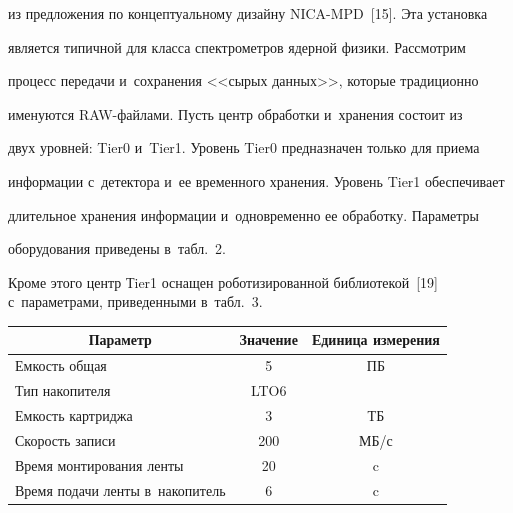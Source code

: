 из предложения по концептуальному дизайну NICA-MPD~[15]. Эта установка


является типичной для класса спектрометров ядерной физики. Рассмотрим


процесс передачи и~сохранения <<сырых данных>>, которые традиционно


именуются RAW-фай\-ла\-ми. Пусть центр обработки и~хранения состоит из


двух уровней: Tier0 и~Tier1. Уровень Tier0 предназначен только для приема


информации с~детектора и~ее временного хранения. Уровень Tier1 обеспечивает


длительное хранения информации и~одновременно ее обработку. Параметры


оборудования приведены в~табл.~2.














  Кроме этого центр Тier1 оснащен роботизированной библиотекой~[19] с~параметрами, приведенными в~табл.~3.





  \begin{table}\small


  \begin{center}




  \vspace*{2ex}





  \begin{tabular}{|l|c|c|}


  \hline


\multicolumn{1}{|c|}{Параметр}&Значение&Единица измерения\\


\hline


Емкость общая &5&ПБ\\


Тип накопителя&LTO6&\\


Емкость картриджа&3&ТБ\\


Скорость записи &200&МБ/с\\


Время монтирования ленты &20&c\\


Время подачи ленты в~накопитель &6&c\\


\hline


\end{tabular}


\end{center}


\vspace*{-6pt}


\end{table}





